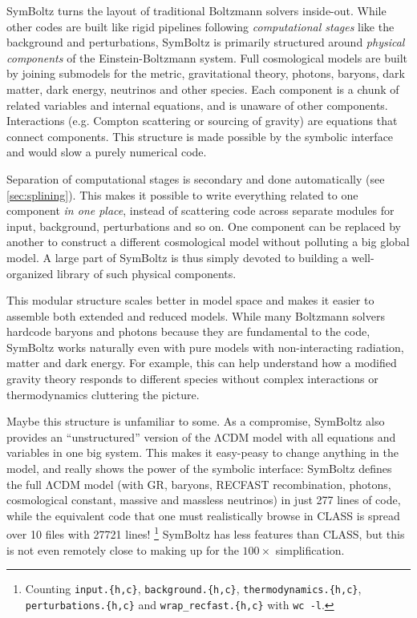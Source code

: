 \documentclass{aa}
\newcommand{\LCDM}{$\mathrm{\Lambda C D M}$}
\begin{document}
SymBoltz turns the layout of traditional Boltzmann solvers inside-out.
While other codes are built like rigid pipelines following \emph{computational stages} like the background and perturbations,
SymBoltz is primarily structured around \emph{physical components} of the Einstein-Boltzmann system.
Full cosmological models are built by joining submodels for the metric, gravitational theory, photons, baryons, dark matter, dark energy, neutrinos and other species.
Each component is a chunk of related variables and internal equations, and is unaware of other components.
Interactions (e.g. Compton scattering or sourcing of gravity) are equations that connect components.
This structure is made possible by the symbolic interface and would slow a purely numerical code.

Separation of computational stages is secondary and done automatically (see \cref{sec:splining}).
This makes it possible to write everything related to one component \emph{in one place}, instead of scattering code across separate modules for input, background, perturbations and so on.
One component can be replaced by another to construct a different cosmological model without polluting a big global model.
A large part of SymBoltz is thus simply devoted to building a well-organized library of such physical components.

This modular structure scales better in model space and makes it easier to assemble both extended and reduced models.
While many Boltzmann solvers hardcode baryons and photons because they are fundamental to the code, SymBoltz works naturally even with pure models with non-interacting radiation, matter and dark energy.
For example, this can help understand how a modified gravity theory responds to different species without complex interactions or thermodynamics cluttering the picture.

Maybe this structure is unfamiliar to some.
As a compromise, SymBoltz also provides an \enquote{unstructured} version of the \LCDM{} model with all equations and variables in one big system.
This makes it easy-peasy to change anything in the model, and really shows the power of the symbolic interface:
SymBoltz defines the full \LCDM{} model (with GR, baryons, RECFAST recombination, photons, cosmological constant, massive and massless neutrinos) in just 277 lines of code, while the equivalent code that one must realistically browse in CLASS is spread over 10 files with 27721 lines!%
\footnote{Counting \texttt{input.\{h,c\}}, \texttt{background.\{h,c\}}, \texttt{thermodynamics.\{h,c\}}, \texttt{perturbations.\{h,c\}} and \texttt{wrap\_recfast.\{h,c\}} with \texttt{wc -l}.}
SymBoltz has less features than CLASS, but this is not even remotely close to making up for the $100\times$ simplification.
\end{document}
